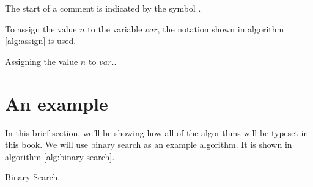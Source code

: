 The start of a comment is indicated by the symbol \commentsymbol.

To assign the value $n$ to the variable $var$, the notation shown in
algorithm \ref{alg:assign} is used.

\begin{algorithm}[H]
  \caption{Assigning the value $n$ to $var$..}
  \label{alg:assign}
  \begin{algorithmic}[1]
  \end{algorithmic}
\end{algorithm}

\section{An example}

In this brief section, we'll be showing how all of the algorithms will
be typeset in this book. We will use binary search as an example
algorithm. It is shown in algorithm \ref{alg:binary-search}.

\begin{algorithm}[H]
  \caption{Binary Search.}
  \label{alg:binary-search}
  \begin{algorithmic}[1]
      \Repeat
        \Else
        \EndIf
    \EndFunction
  \end{algorithmic}
\end{algorithm}